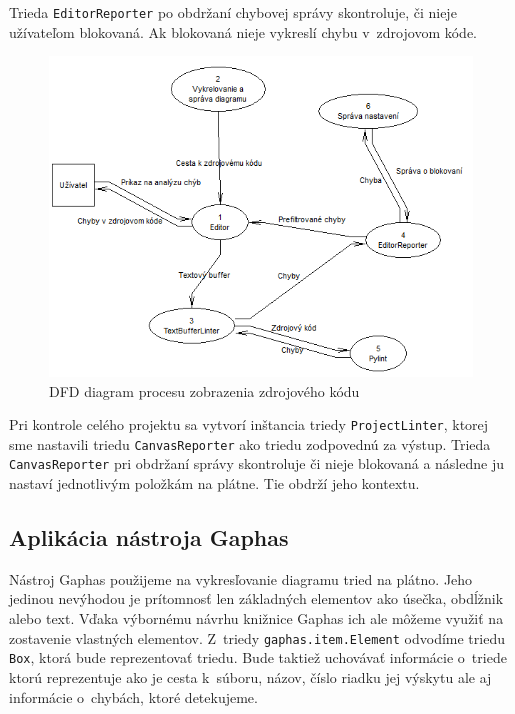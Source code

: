 \documentclass[11pt,oneside,final]{fithesis2}
\begin{document}
		Trieda \texttt{EditorReporter} po obdržaní chybovej správy skontroluje, či nieje užívateľom blokovaná. Ak blokovaná nieje vykreslí chybu v~zdrojovom kóde.

	
	\begin{figure}[htb]
	 \centering
	 \includegraphics[width=\textwidth]{images/dfd_editor}
	 \caption{DFD diagram procesu zobrazenia zdrojového kódu}
	\end{figure}

		
	Pri kontrole celého projektu sa vytvorí inštancia triedy \texttt{ProjectLinter}, ktorej sme nastavili triedu \texttt{CanvasReporter} ako triedu zodpovednú za výstup. Trieda \texttt{CanvasReporter} pri obdržaní správy skontroluje či nieje blokovaná a následne ju nastaví jednotlivým položkám na plátne. Tie obdrží jeho kontextu.
 
		\subsection{Aplikácia nástroja Gaphas}
		
		Nástroj Gaphas použijeme na vykresľovanie diagramu tried na plátno. Jeho jedinou nevýhodou je prítomnosť len základných elementov ako úsečka, obdĺžnik alebo text. Vďaka výbornému návrhu knižnice Gaphas ich ale môžeme využiť na zostavenie vlastných elementov. Z~triedy \texttt{gaphas.item.Element} odvodíme triedu \texttt{Box}, ktorá bude reprezentovať triedu. Bude taktiež uchovávať informácie o~triede ktorú reprezentuje ako je cesta k~súboru, názov, číslo riadku jej výskytu ale aj informácie o~chybách, ktoré detekujeme.
		
\end{document}
